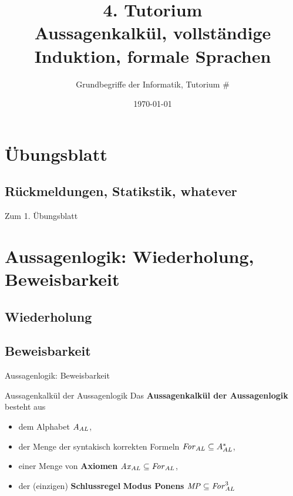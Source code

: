 



\title[Aussagenkalkül, vollständige Induktion, formale Sprachen]{4. Tutorium\\ Aussagenkalkül, vollständige Induktion, formale Sprachen}
\subtitle{Grundbegriffe der Informatik, Tutorium \#\mytutnumber}
\date{\today}


\titleframe
\roadmap

\section*{Übungsblatt}
\subsection{Rückmeldungen, Statikstik, whatever}
	\begin{frame}{Zum 1. Übungsblatt}
	\end{frame}

\section[Boolsche Algebra]{Aussagenlogik: Wiederholung, Beweisbarkeit}
\subsection{Wiederholung}
\subsection{Beweisbarkeit}
\begin{frame}{Aussagenlogik: Beweisbarkeit}
	\begin{block}{Aussagenkalkül der Aussagenlogik}
		Das \textbf{Aussagenkalkül der Aussagenlogik} besteht aus
		\begin{itemize}
			\item dem Alphabet $A_{AL}$,
			\item der Menge der syntakisch korrekten Formeln $\hbox{\textit{For}}_{AL} \subseteq A_{AL}^*$,
			\item einer Menge von \textbf{Axiomen} $\hbox{\textit{Ax}}_{AL} \subseteq \hbox{\textit{For}}_{AL}$,
			\item der (einzigen) \textbf{Schlussregel} \textbf{Modus Ponens} $\hbox{\textit{MP}} \subseteq \hbox{\textit{For}}_{AL}^3$
		\end{itemize}
	\end{block}
\end{frame}

